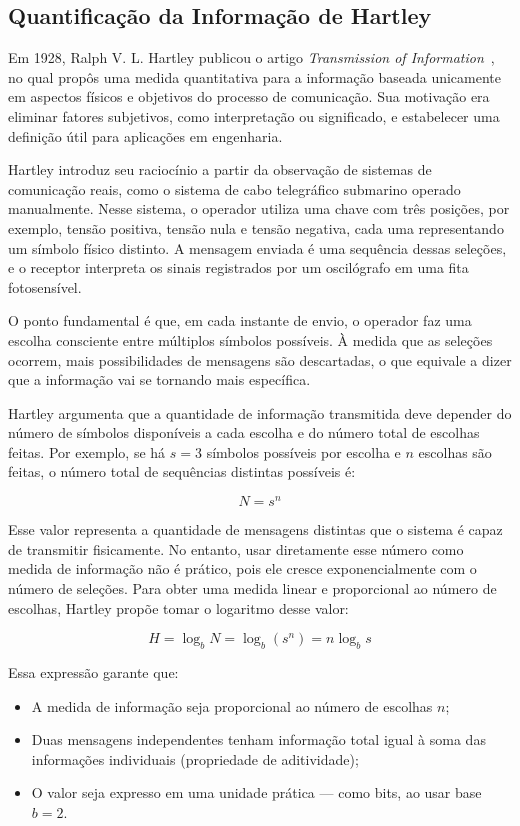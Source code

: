 \subsection{Quantificação da Informação de Hartley}
Em 1928, Ralph V. L. Hartley publicou o artigo \textit{Transmission of Information}~\cite{hartley1928}, no qual propôs uma medida quantitativa para a informação baseada unicamente em aspectos físicos e objetivos do processo de comunicação. Sua motivação era eliminar fatores subjetivos, como interpretação ou significado, e estabelecer uma definição útil para aplicações em engenharia.

Hartley introduz seu raciocínio a partir da observação de sistemas de comunicação reais, como o sistema de cabo telegráfico submarino operado manualmente. Nesse sistema, o operador utiliza uma chave com três posições, por exemplo, tensão positiva, tensão nula e tensão negativa, cada uma representando um símbolo físico distinto. A mensagem enviada é uma sequência dessas seleções, e o receptor interpreta os sinais registrados por um oscilógrafo em uma fita fotosensível.

O ponto fundamental é que, em cada instante de envio, o operador faz uma escolha consciente entre múltiplos símbolos possíveis. À medida que as seleções ocorrem, mais possibilidades de mensagens são descartadas, o que equivale a dizer que a informação vai se tornando mais específica.

Hartley argumenta que a quantidade de informação transmitida deve depender do número de símbolos disponíveis a cada escolha e do número total de escolhas feitas. Por exemplo, se há \( s = 3 \) símbolos possíveis por escolha e \( n \) escolhas são feitas, o número total de sequências distintas possíveis é:

\[
N = s^n
\]

Esse valor representa a quantidade de mensagens distintas que o sistema é capaz de transmitir fisicamente. No entanto, usar diretamente esse número como medida de informação não é prático, pois ele cresce exponencialmente com o número de seleções. Para obter uma medida linear e proporcional ao número de escolhas, Hartley propõe tomar o logaritmo desse valor:

\[
H = \log_b N = \log_b (s^n) = n \log_b s
\]

Essa expressão garante que:
\begin{itemize}
    \item A medida de informação seja proporcional ao número de escolhas \( n \);
    \item Duas mensagens independentes tenham informação total igual à soma das informações individuais (propriedade de aditividade);
    \item O valor seja expresso em uma unidade prática — como bits, ao usar base \( b = 2 \).
\end{itemize}

